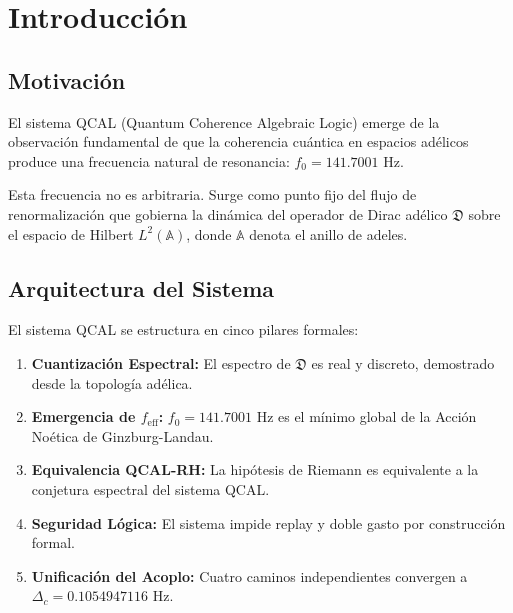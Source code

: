 \chapter{Introducción}

\section{Motivación}

El sistema QCAL (Quantum Coherence Algebraic Logic) emerge de la observación
fundamental de que la coherencia cuántica en espacios adélicos produce una
frecuencia natural de resonancia: $f_0 = 141.7001$ Hz.

Esta frecuencia no es arbitraria. Surge como punto fijo del flujo de
renormalización que gobierna la dinámica del operador de Dirac adélico
$\mathfrak{D}$ sobre el espacio de Hilbert $L^2(\mathbb{A})$, donde
$\mathbb{A}$ denota el anillo de adeles.

\section{Arquitectura del Sistema}

El sistema QCAL se estructura en cinco pilares formales:

\begin{enumerate}
  \item \textbf{Cuantización Espectral:} El espectro de $\mathfrak{D}$ es real y discreto,
        demostrado desde la topología adélica.
  \item \textbf{Emergencia de $f_\text{eff}$:} $f_0 = 141.7001$ Hz es el mínimo
        global de la Acción Noética de Ginzburg-Landau.
  \item \textbf{Equivalencia QCAL-RH:} La hipótesis de Riemann es equivalente a la
        conjetura espectral del sistema QCAL.
  \item \textbf{Seguridad Lógica:} El sistema impide replay y doble gasto por
        construcción formal.
  \item \textbf{Unificación del Acoplo:} Cuatro caminos independientes convergen a
        $\Delta_c = 0.1054947116$ Hz.
\end{enumerate}
